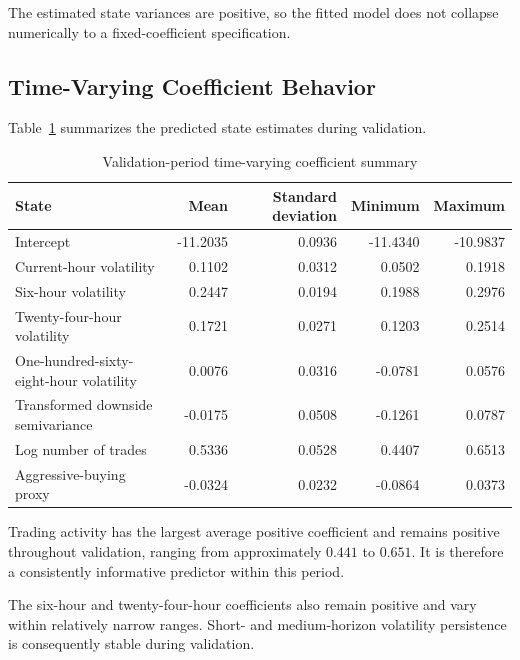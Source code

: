The estimated state variances are positive, so the fitted model
does not collapse numerically to a fixed-coefficient
specification.

\subsection{Time-Varying Coefficient Behavior}

Table~\ref{tab:tvp-state-summary} summarizes the predicted
state estimates during validation.

\begin{table}[H]
\centering
\caption{Validation-period time-varying coefficient summary}
\label{tab:tvp-state-summary}
\scriptsize
\begin{tabular}{p{5.3cm}rrrr}
\toprule
State
& Mean
& Standard deviation
& Minimum
& Maximum \\
\midrule
Intercept
& -11.2035
& 0.0936
& -11.4340
& -10.9837 \\

Current-hour volatility
& 0.1102
& 0.0312
& 0.0502
& 0.1918 \\

Six-hour volatility
& 0.2447
& 0.0194
& 0.1988
& 0.2976 \\

Twenty-four-hour volatility
& 0.1721
& 0.0271
& 0.1203
& 0.2514 \\

One-hundred-sixty-eight-hour volatility
& 0.0076
& 0.0316
& -0.0781
& 0.0576 \\

Transformed downside semivariance
& -0.0175
& 0.0508
& -0.1261
& 0.0787 \\

Log number of trades
& 0.5336
& 0.0528
& 0.4407
& 0.6513 \\

Aggressive-buying proxy
& -0.0324
& 0.0232
& -0.0864
& 0.0373 \\
\bottomrule
\end{tabular}
\end{table}

Trading activity has the largest average positive coefficient
and remains positive throughout validation, ranging from
approximately \(0.441\) to \(0.651\). It is therefore a
consistently informative predictor within this period.

The six-hour and twenty-four-hour coefficients also remain
positive and vary within relatively narrow ranges. Short- and
medium-horizon volatility persistence is consequently stable
during validation.

